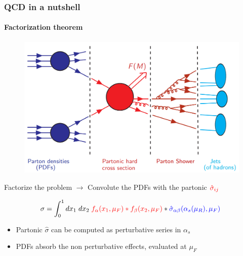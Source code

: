 \documentclass[aspectratio=43]{beamer}
\begin{document}
\begin{frame}

	\frametitle{QCD in a nutshell}
	\framesubtitle{Factorization theorem}

	\begin{figure}
		\includegraphics[width = 8 cm]{plots/factorization_1.png}
	\end{figure}
	
	Factorize the problem $\longrightarrow$ Convolute the {\color{blue}PDFs} with the partonic ${\color{red}\hat{\sigma}_{i j}}$
	
	\begin{equation}
		\sigma = \int_{0}^{1} dx_{1} \; dx_{2} \; {\color{red} f_{\alpha}(x_{1}, \mu_{F}) \ast f_{\beta}(x_{2}, \mu_{F})} \ast {\color{blue}\hat{\sigma}_{\alpha \beta}(\alpha_{s}(\mu_{R}), \mu_{F})} \; \nonumber
	\end{equation}
	
	\begin{itemize}
		\item Partonic {\color{red}$\hat{\sigma}$} can be computed as perturbative series in $\alpha_{s}$
		\item {\color{blue}PDFs} absorb the non perturbative effects, evaluated at $\mu_{F}$
	\end{itemize}

\end{frame}
\end{document}
